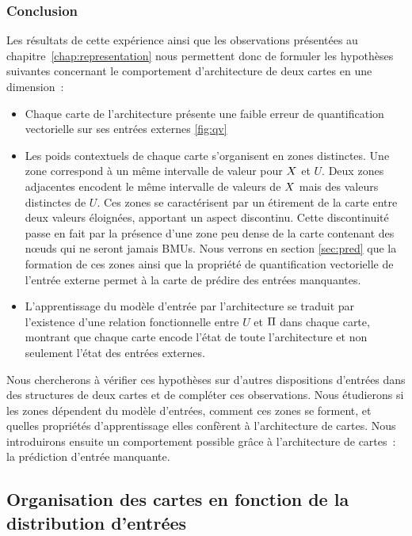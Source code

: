 \documentclass[../main]{subfiles}
\begin{document}
\subsubsection{Conclusion}

Les résultats de cette expérience ainsi que les observations présentées au chapitre~\ref{chap:representation} nous permettent donc de formuler les hypothèses suivantes concernant le comportement d'architecture de deux cartes en une dimension~:

\begin{itemize}
	\item Chaque carte de l'architecture présente une faible erreur de quantification vectorielle sur ses entrées externes \ref{fig:qv}
	\item Les poids contextuels de chaque carte s'organisent en zones distinctes. Une zone correspond à un même intervalle de valeur pour $X$ et $U$. Deux zones adjacentes encodent le même intervalle de valeurs de $X$ mais des valeurs distinctes de $U$. Ces zones se caractérisent par un étirement de la carte entre deux valeurs éloignées, apportant un aspect discontinu. Cette discontinuité passe en fait par la présence d'une zone peu dense de la carte contenant des n\oe{}uds qui ne seront jamais BMUs. Nous verrons en section \ref{sec:pred} que la formation de ces zones ainsi que la propriété de quantification vectorielle de l'entrée externe permet à la carte de prédire des entrées manquantes.
	\item L'apprentissage du modèle d'entrée par l'architecture se traduit par l'existence d'une relation fonctionnelle entre $U$ et $\Pi$ dans chaque carte, montrant que chaque carte encode l'état de toute l'architecture et non seulement l'état des entrées externes.
\end{itemize}

Nous chercherons à vérifier ces hypothèses sur d'autres dispositions d'entrées dans des structures de deux cartes et de compléter ces observations.
Nous étudierons si les zones dépendent du modèle d'entrées, comment ces zones se forment, et quelles propriétés d'apprentissage elles confèrent à l'architecture de cartes.
Nous introduirons ensuite un comportement possible grâce à l'architecture de cartes~: la prédiction d'entrée manquante.

\subsection{Organisation des cartes en fonction de la distribution d'entrées}
\end{document}

